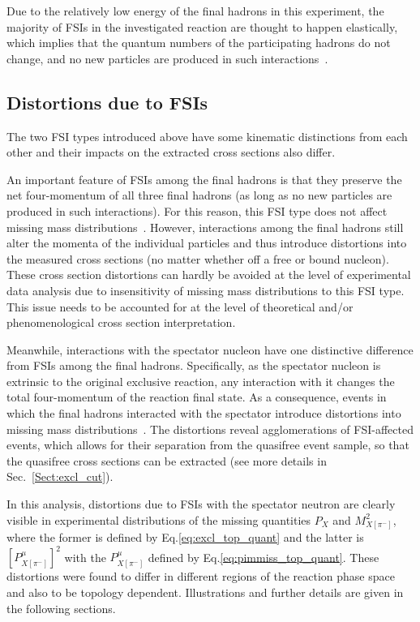 \documentclass[prc,twocolumn,superscriptaddress,showpacs,amssymb,amsmath,amsfonts,aps,nofootinbib]{revtex4-1}
\begin{document}
Due to the relatively low energy of the final hadrons in this experiment, the majority of FSIs in the investigated reaction are thought to happen elastically, which implies that the quantum numbers of the participating hadrons do not change, and no new particles are produced in such interactions~\cite{Shirokov_Yudin:1980}.  


\subsection{Distortions due to FSIs}
\label{Sect:fsi_probing}

The two FSI types introduced above have some kinematic distinctions from each other and their impacts on the extracted cross sections also differ.%


An important feature of FSIs among the final hadrons is that they preserve the net four-momentum of all three final hadrons (as long as no new particles are produced in such interactions). For this reason, this FSI type does not affect missing mass distributions~\cite{my_thesis:2021}. However, interactions among the final hadrons still alter the momenta of the individual particles and thus introduce distortions into the measured cross sections (no matter whether off a free or bound nucleon). These cross section distortions can hardly be avoided at the level of experimental data analysis due to insensitivity of missing mass distributions to this FSI type. This issue needs to be accounted for at the level of theoretical and/or phenomenological cross section interpretation.


Meanwhile, interactions with the spectator nucleon have one distinctive difference from FSIs among the final hadrons. Specifically, as the spectator nucleon is extrinsic to the original exclusive reaction, any interaction with it changes the total four-momentum of the reaction final state. As a consequence, events in which the final hadrons interacted with the spectator introduce distortions into missing mass distributions~\cite{note_mm_distr}. The distortions reveal agglomerations of FSI-affected events, which allows for their separation from the quasifree event sample, so that the quasifree cross sections can be extracted (see more details in Sec.\!~\ref{Sect:excl_cut}). 


In this analysis, distortions due to FSIs with the spectator neutron are clearly visible in experimental distributions of the missing quantities $P_{X}$ and  $M^{2}_{X[\pi^{-}]}$, where the former is defined by Eq.\eqref{eq:excl_top_quant} and the latter is $[P_{X[\pi^{-}]}^{\mu}]^2$ with the $P_{X[\pi^{-}]}^{\mu}$ defined by Eq.\eqref{eq:pimmiss_top_quant}. These distortions were found to differ in different regions of the reaction phase space and also to be topology dependent. Illustrations and further details are given in the following sections.
\end{document}
